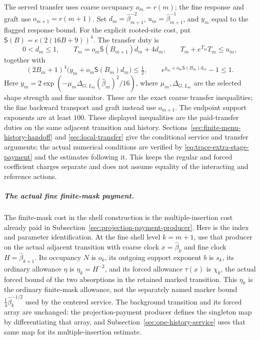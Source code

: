 The served transfer uses coarse occupancy $o_m=r(m)$; the fine response
and graft use $o_{m+1}=r(m+1)$. Set
$d_m=\widehat\beta_{m+1}^{-2}$,
$u_m=\widehat\beta_{m+1}^{-1}$, and $y_m$ equal to the flagged response
bound. For the explicit rooted-site cost, put
$\mathsf S(B)=e(2(16B+9))^4$. The transfer duty is
\[
 0<d_m\leq1,\qquad
 T_m=o_m\mathsf S(B_{m+1})d_m+4d_m,\qquad
 T_m+e^{T_m}T_m\leq u_m,
\]
together with
\[
 (2B_m+1)^4\bigl(y_m+o_m\mathsf S(B_m)d_m\bigr)
       \leq\tfrac12,\qquad
 e^{y_m+o_m\mathsf S(B_m)d_m}-1\leq1.
\]
Here $y_m=2\exp(-\mu_m\Delta_{G,L_m}(\widehat\beta_m)^2/16)$,
where $\mu_m,\Delta_{G,L_m}$ are the selected shape strength and fine
monitor. These are the exact coarse transfer inequalities; the fine
backward transport and graft instead use $o_{m+1}$. The endpoint support
exponents are at least $100$. These displayed inequalities are the paid-transfer duties on
the same adjacent transition and history.
Sections~\ref{sec:finite-menu-history-handoff} and
\ref{sec:local-transfer} give the conditional service and transfer
arguments; the actual numerical conditions are verified by
\eqref{eq:trace-extra-stage-payment} and the estimates following it. This keeps the
regular and forced coefficient charges separate and does not assume
equality of the interacting and reference actions.

\subparagraph{The actual fine finite-mask payment.}\label{par:shell-actual-mask}
The finite-mask cost in the shell construction is the multiple-insertion
cost already paid in Subsection~\ref{sec:projection-payment-producer}.
Here is the index and parameter identification. At the fine shell level
$k=m+1$, use that producer on the actual adjacent transition with coarse
clock $x=\widehat\beta_k$ and fine clock
$H=\widehat\beta_{k+1}$. Its occupancy $N$ is $o_k$, its outgoing
support exponent $b$ is $s_k$, its ordinary allowance $\eta$ is
$\eta_k=H^{-2}$, and its forced allowance $\tau(x)$ is $\chi_k$,
the actual forced bound of the two absorptions in the retained marked
transition. This $\eta_k$ is the ordinary finite-mask allowance, not
the separately named marker bound
$\tfrac14\widehat\beta_k^{-1/2}$ used by the centered service.
The background transition and its forced array are unchanged: the
projection-payment producer defines the singleton map by differentiating
that array, and Subsection~\ref{sec:ope-history-service} uses that same map
for its multiple-insertion estimate.

